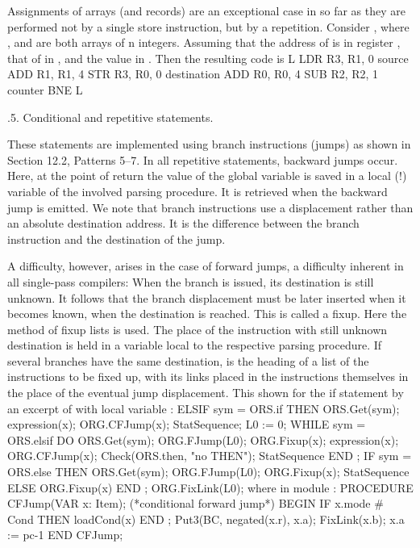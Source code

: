 Assignments of arrays (and records) are an exceptional case in so far as they are performed not by a single store instruction, but by a repetition. Consider , where , and  are both arrays of n integers. Assuming that the address of  is in register , that of  in , and the value  in . Then the resulting code is
\begintt
L  LDR R3, R1, 0 source
   ADD R1, R1, 4
   STR R3, R0, 0 destination
   ADD R0, R0, 4
   SUB R2, R2, 1 counter
   BNE L
\endtt

.5. Conditional and repetitive statements.

These statements are implemented using branch instructions (jumps) as shown in Section 12.2, Patterns 5--7. In all repetitive statements, backward jumps occur. Here, at the point of return the value of the global variable  is saved in a local (!) variable of the involved parsing procedure. It is retrieved when the backward jump is emitted. We note that branch instructions use a displacement rather than an absolute destination address. It is the difference between the branch instruction and the destination of the jump.

A difficulty, however, arises in the case of forward jumps, a difficulty inherent in all single-pass compilers: When the branch is issued, its destination is still unknown. It follows that the branch displacement must be later inserted when it becomes known, when the destination is reached. This is called a fixup. Here the method of fixup lists is used. The place of the instruction with still unknown destination is held in a variable  local to the respective parsing procedure. If several branches have the same destination,  is the heading of a list of the instructions to be fixed up, with its links placed in the instructions themselves in the place of the eventual jump displacement. This shown for the if statement by an excerpt of  with local variable :
\begintt
ELSIF sym = ORS.if THEN
  ORS.Get(sym);
  expression(x);
  ORG.CFJump(x);
  StatSequence;
  L0 := 0;
  WHILE sym = ORS.elsif DO
    ORS.Get(sym);
    ORG.FJump(L0);
    ORG.Fixup(x);
    expression(x);
    ORG.CFJump(x);
    Check(ORS.then, "no THEN");
    StatSequence
  END ;
  IF sym = ORS.else THEN
    ORS.Get(sym);
    ORG.FJump(L0);
    ORG.Fixup(x);
    StatSequence
  ELSE
    ORG.Fixup(x)
  END ;
  ORG.FixLink(L0);
\endtt
\noindent where in module :
\begintt
PROCEDURE CFJump(VAR x: Item); (*conditional forward jump*)
BEGIN
  IF x.mode # Cond THEN loadCond(x) END ;
  Put3(BC, negated(x.r), x.a); FixLink(x.b); x.a := pc-1
END CFJump;

